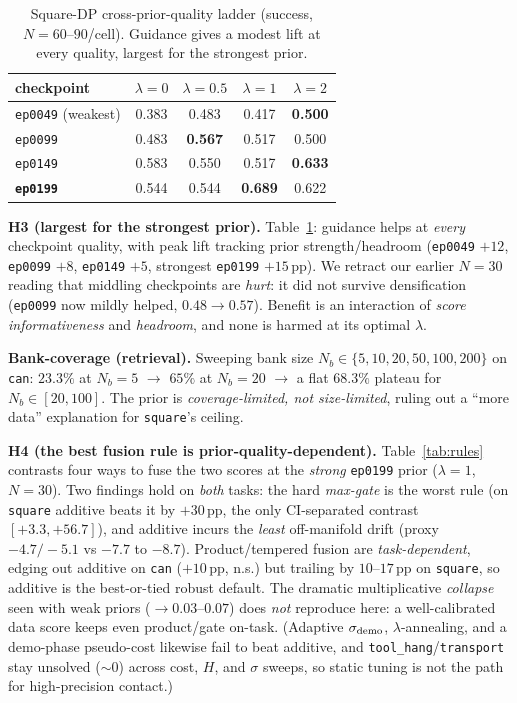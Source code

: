 \documentclass[letterpaper, 10 pt, conference]{ieeeconf}
\begin{document}
\begin{table}[h]
\centering\scriptsize
\setlength{\tabcolsep}{4pt}
\renewcommand{\arraystretch}{0.95}
\caption{Square-DP cross-prior-quality ladder (success, $N\!=\!60$--$90$/cell).
Guidance gives a modest lift at every quality, largest for the strongest prior.}
\label{tab:ladder}
\begin{tabular}{@{}lcccc@{}}
\hline
checkpoint & $\lambda\!=\!0$ & $\lambda\!=\!0.5$ & $\lambda\!=\!1$ & $\lambda\!=\!2$ \\
\hline
\texttt{ep0049} (weakest) & 0.383 & 0.483 & 0.417 & \textbf{0.500} \\
\texttt{ep0099}           & 0.483 & \textbf{0.567} & 0.517 & 0.500 \\
\texttt{ep0149}           & 0.583 & 0.550 & 0.517 & \textbf{0.633} \\
\textbf{\texttt{ep0199}}  & 0.544 & 0.544 & \textbf{0.689} & 0.622 \\
\hline
\end{tabular}
\end{table}

\textbf{H3 (largest for the strongest prior).} Table~\ref{tab:ladder}:
guidance helps at \emph{every} checkpoint quality, with peak lift tracking
prior strength/headroom (\texttt{ep0049} $+12$, \texttt{ep0099} $+8$,
\texttt{ep0149} $+5$, strongest \texttt{ep0199} $+15$\,pp). We retract our
earlier $N\!=\!30$ reading that middling checkpoints are \emph{hurt}: it did
not survive densification (\texttt{ep0099} now mildly helped,
$0.48\!\to\!0.57$). Benefit is an interaction of \emph{score
informativeness} and \emph{headroom}, and none is harmed at its optimal
$\lambda$.

\textbf{Bank-coverage (retrieval).} Sweeping bank size
$N_b\!\in\!\{5,10,20,50,100,200\}$ on \texttt{can}: $23.3\%$ at $N_b\!=\!5$
$\rightarrow$ $65\%$ at $N_b\!=\!20$ $\rightarrow$ a flat
$\mathbf{68.3\%}$ plateau for $N_b\!\in\![20,100]$. The prior is
\emph{coverage-limited, not size-limited}, ruling out a ``more data''
explanation for \texttt{square}'s ceiling.

\textbf{H4 (the best fusion rule is prior-quality-dependent).}
Table~\ref{tab:rules} contrasts four ways to fuse the two scores at the
\emph{strong} \texttt{ep0199} prior ($\lambda\!=\!1$, $N\!=\!30$). Two
findings hold on \emph{both} tasks: the hard \emph{max-gate} is the worst
rule (on \texttt{square} additive beats it by $+30$\,pp, the only
CI-separated contrast $[+3.3,+56.7]$), and additive incurs the
\emph{least} off-manifold drift (proxy $-4.7/-5.1$ vs $-7.7$ to $-8.7$).
Product/tempered fusion are \emph{task-dependent}, edging out additive on
\texttt{can} ($+10$\,pp, n.s.) but trailing by $10$--$17$\,pp on
\texttt{square}, so additive is the best-or-tied robust default. The
dramatic multiplicative \emph{collapse} seen with weak priors
($\to\!0.03$--$0.07$) does \emph{not} reproduce here: a well-calibrated
data score keeps even product/gate on-task. (Adaptive $\sigma_{\rm demo}$,
$\lambda$-annealing, and a demo-phase pseudo-cost likewise fail to beat
additive, and \texttt{tool\_hang}/\texttt{transport} stay unsolved
($\sim\!0$) across cost, $H$, and $\sigma$ sweeps, so static tuning is not
the path for high-precision contact.)
\end{document}
